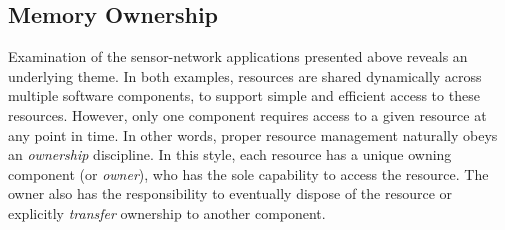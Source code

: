 





\subsection{Memory Ownership}

Examination of the sensor-network applications 
presented above reveals an underlying
theme.  In both examples, resources are shared dynamically across multiple
software components, to support simple and efficient access to these
resources.  However, only one component requires access to a given
resource at any point in time.  
In other words, proper resource management
naturally obeys an {\em ownership} discipline.  In this
style, each resource has a unique owning component (or {\em owner}), 
who has the sole
capability to access the resource.  The owner also has the responsibility to
eventually dispose of the resource or explicitly {\em transfer} 
ownership to another
component.

